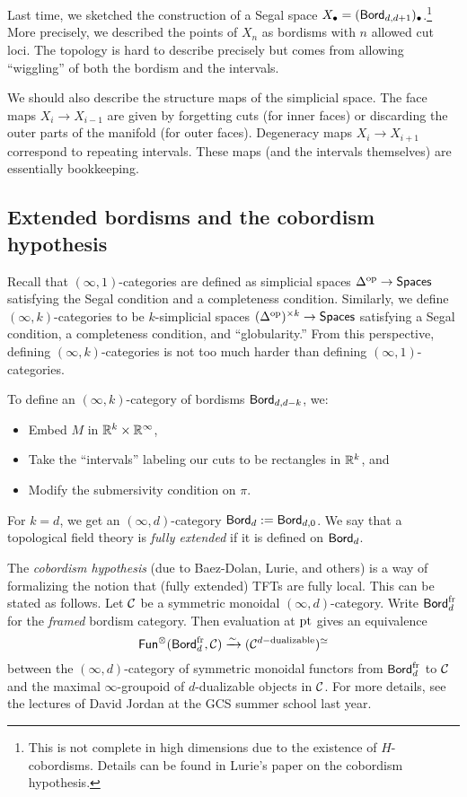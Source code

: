Last time, we sketched the construction of a Segal space $X_\bullet = (\mathsf{Bord}_{d,d+1})_\bullet$.\footnote{This is not complete in high dimensions due to the existence of $H$-cobordisms.
Details can be found in Lurie's paper on the cobordism hypothesis.}
More precisely, we described the points of $X_n$ as bordisms with $n$ allowed cut loci.
The topology is hard to describe precisely but comes from allowing ``wiggling'' of both the bordism and the intervals.

We should also describe the structure maps of the simplicial space.
The face maps $X_i \to X_{i-1}$ are given by forgetting cuts (for inner faces) or discarding the outer parts of the manifold (for outer faces).
Degeneracy maps $X_i \to X_{i+1}$ correspond to repeating intervals.
These maps (and the intervals themselves) are essentially bookkeeping.

\subsection{Extended bordisms and the cobordism hypothesis}

Recall that $(\infty, 1)$-categories are defined as simplicial spaces $\Delta^{\mathrm{op}} \to \mathsf{Spaces}$ satisfying the Segal condition and a completeness condition.
Similarly, we define $(\infty, k)$-categories to be $k$-simplicial spaces $(\Delta^{\mathrm{op}})^{\times k} \to \mathsf{Spaces}$ satisfying a Segal condition, a completeness condition, and ``globularity.''
From this perspective, defining $(\infty, k)$-categories is not too much harder than defining $(\infty, 1)$-categories.

To define an $(\infty, k)$-category of bordisms $\mathsf{Bord}_{d,d-k}$, we:
\begin{itemize}
	\item Embed $M$ in $\mathbb{R}^k \times \mathbb{R}^\infty$,
	\item Take the ``intervals'' labeling our cuts to be rectangles in $\mathbb{R}^k$, and
	\item Modify the submersivity condition on $\pi$.
\end{itemize}

For $k = d$, we get an $(\infty, d)$-category $\mathsf{Bord}_d := \mathsf{Bord}_{d,0}$.
We say that a topological field theory is \emph{fully extended} if it is defined on $\mathsf{Bord}_d$.

The \emph{cobordism hypothesis} (due to Baez-Dolan, Lurie, and others) is a way of formalizing the notion that (fully extended) TFTs are fully local.
This can be stated as follows.
Let $\mathcal{C}$ be a symmetric monoidal $(\infty, d)$-category.
Write $\mathsf{Bord}_d^{\mathrm{fr}}$ for the \emph{framed} bordism category.
Then evaluation at $\operatorname{pt}$ gives an equivalence
\[
	\mathsf{Fun}^\otimes(\mathsf{Bord}_d^{\mathrm{fr}}, \mathcal{C}) \xrightarrow{\sim} (\mathcal{C}^{d\mathrm{-dualizable}})^{\simeq}
\]
between the $(\infty, d)$-category of symmetric monoidal functors from $\mathsf{Bord}_d^{\mathrm{fr}}$ to $\mathcal{C}$ and the maximal $\infty$-groupoid of $d$-dualizable objects in $\mathcal{C}$.
For more details, see the lectures of David Jordan at the GCS summer school last year.

